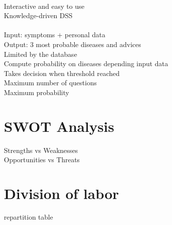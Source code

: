 \paragraph{}
Interactive and easy to use \\
Knowledge-driven DSS

\paragraph{}
Input: symptoms + personal data \\
Output: 3 most probable diseases and advices \\
Limited by the database \\
Compute probability on diseases depending input data \\
Takes decision when threshold reached \\
Maximum number of questions \\
Maximum probability 


\section{SWOT Analysis}

\paragraph{}
Strengths vs Weaknesses \\
Opportunities vs Threats

\section{Division of labor}

repartition table